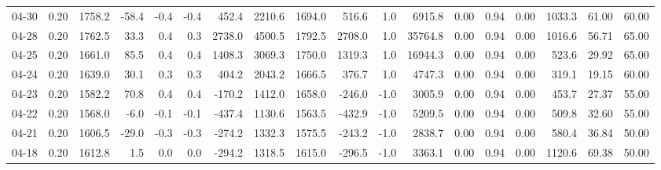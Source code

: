 \begin{threeparttable}
{\begin{tabular}{lrrrrrrrrrrrrrrrrr}
  04-30 &     0.20 & 1758.2 &             -58.4 &              -0.4 &               -0.4 &              452.4 & 2210.6 & 1694.0 &      516.6 &                      1.0 &              6915.8 &       0.00 &      0.94 &           0.00 &           1033.3 &           61.00 &                  60.00 \\
  04-28 &     0.20 & 1762.5 &              33.3 &               0.4 &                0.3 &             2738.0 & 4500.5 & 1792.5 &     2708.0 &                      1.0 &             35764.8 &       0.00 &      0.94 &           0.00 &           1016.6 &           56.71 &                  65.00 \\
  04-25 &     0.20 & 1661.0 &              85.5 &               0.4 &                0.4 &             1408.3 & 3069.3 & 1750.0 &     1319.3 &                      1.0 &             16944.3 &       0.00 &      0.94 &           0.00 &            523.6 &           29.92 &                  65.00 \\
  04-24 &     0.20 & 1639.0 &              30.1 &               0.3 &                0.3 &              404.2 & 2043.2 & 1666.5 &      376.7 &                      1.0 &              4747.3 &       0.00 &      0.94 &           0.00 &            319.1 &           19.15 &                  60.00 \\
  04-23 &     0.20 & 1582.2 &              70.8 &               0.4 &                0.4 &             -170.2 & 1412.0 & 1658.0 &     -246.0 &                     -1.0 &              3005.9 &       0.00 &      0.94 &           0.00 &            453.7 &           27.37 &                  55.00 \\
  04-22 &     0.20 & 1568.0 &              -6.0 &              -0.1 &               -0.1 &             -437.4 & 1130.6 & 1563.5 &     -432.9 &                     -1.0 &              5209.5 &       0.00 &      0.94 &           0.00 &            509.8 &           32.60 &                  55.00 \\
  04-21 &     0.20 & 1606.5 &             -29.0 &              -0.3 &               -0.3 &             -274.2 & 1332.3 & 1575.5 &     -243.2 &                     -1.0 &              2838.7 &       0.00 &      0.94 &           0.00 &            580.4 &           36.84 &                  50.00 \\
  04-18 &     0.20 & 1612.8 &               1.5 &               0.0 &                0.0 &             -294.2 & 1318.5 & 1615.0 &     -296.5 &                     -1.0 &              3363.1 &       0.00 &      0.94 &           0.00 &           1120.6 &           69.38 &                  50.00 \\

\end{tabular}}
\end{threeparttable}
